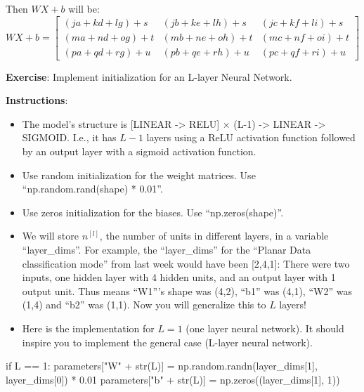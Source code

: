Then $WX + b$ will be:
\begin{equation}
WX + b = \begin{bmatrix}
    (ja + kd + lg) + s  & (jb + ke + lh) + s  & (jc + kf + li)+ s\\
    (ma + nd + og) + t & (mb + ne + oh) + t & (mc + nf + oi) + t\\
    (pa + qd + rg) + u & (pb + qe + rh) + u & (pc + qf + ri)+ u
\end{bmatrix}
\end{equation}


{\textbf {Exercise}}: Implement initialization for an L-layer Neural Network.

{\textbf {Instructions}}:
\begin{itemize}
\item The model's structure is [LINEAR -> RELU] $ \times$ (L-1) -> LINEAR -> SIGMOID. I.e., it has $L-1$ layers using a ReLU activation function followed by an output layer with a sigmoid activation function.
\item Use random initialization for the weight matrices. Use ``np.random.rand(shape) * 0.01''.
\item Use zeros initialization for the biases. Use ``np.zeros(shape)''.
\item We will store $n^{[l]}$, the number of units in different layers, in a variable ``layer\_dims''. For example, the ``layer\_dims'' for the ``Planar Data classification mode'' from last week would have been [2,4,1]: There were two inputs, one hidden layer with 4 hidden units, and an output layer with 1 output unit. Thus means ``W1'''s shape was (4,2), ``b1'' was (4,1), ``W2'' was (1,4) and ``b2'' was (1,1). Now you will generalize this to $L$ layers! 
\item Here is the implementation for $L=1$ (one layer neural network). It should inspire you to implement the general case (L-layer neural network).
\end{itemize}

\begin{mypython}
    if L == 1:
        parameters["W" + str(L)] = np.random.randn(layer_dims[1], layer_dims[0]) * 0.01
        parameters["b" + str(L)] = np.zeros((layer_dims[1], 1))
\end{mypython}




